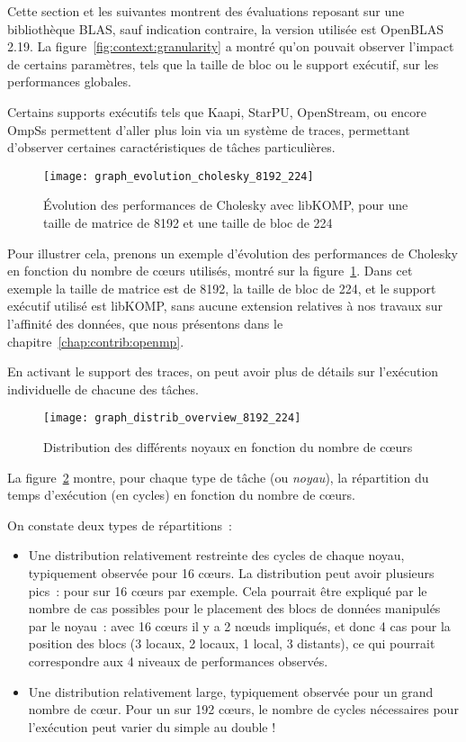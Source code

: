 Cette section et les suivantes montrent des évaluations reposant sur une bibliothèque BLAS, sauf indication contraire, la version utilisée est OpenBLAS 2.19.
La figure~\ref{fig:context:granularity} a montré qu'on pouvait observer l'impact de certains paramètres, tels que la taille de bloc ou le support exécutif, sur les performances globales.

Certains supports exécutifs tels que Kaapi, StarPU, OpenStream, ou encore OmpSs permettent d'aller plus loin via un système de traces, permettant d'observer certaines caractéristiques de tâches particulières.

\begin{figure}[t!]
  \centering
  \texttt{[image: graph\_evolution\_cholesky\_8192\_224]}
  \caption{Évolution des performances de Cholesky avec libKOMP, pour une taille de matrice de 8192 et une taille de bloc de 224}\label{fig:contribs:apps:cholesky:overview-8192-224}
\end{figure}

Pour illustrer cela, prenons un exemple d'évolution des performances de Cholesky en fonction du nombre de cœurs utilisés, montré sur la figure~\ref{fig:contribs:apps:cholesky:overview-8192-224}. Dans cet exemple la taille de matrice est de 8192, la taille de bloc de 224, et le support exécutif utilisé est libKOMP, sans aucune extension relatives à nos travaux sur l'affinité des données, que nous présentons dans le chapitre~\ref{chap:contrib:openmp}.

En activant le support des traces, on peut avoir plus de détails sur l'exécution individuelle de chacune des tâches.

\begin{figure}[h!]
  \centering
  \texttt{[image: graph\_distrib\_overview\_8192\_224]}
  \caption{Distribution des différents noyaux en fonction du nombre de cœurs}\label{fig:contribs:apps:cholesky:distrib-overview-8192-224}
\end{figure}

La figure~\ref{fig:contribs:apps:cholesky:distrib-overview-8192-224} montre, pour chaque type de tâche (ou \emph{noyau}), la répartition du temps d'exécution (en cycles) en fonction du nombre de cœurs.

On constate deux types de répartitions~:
\begin{itemize}
  \item Une distribution relativement restreinte des cycles de chaque noyau, typiquement observée pour 16 cœurs.
    La distribution peut avoir plusieurs pics~: pour \gemm sur 16 cœurs par exemple.
    Cela pourrait être expliqué par le nombre de cas possibles pour le placement des blocs de données manipulés par le noyau~: avec 16 cœurs il y a 2 nœuds impliqués, et donc 4 cas pour la position des blocs (3 locaux, 2 locaux, 1 local, 3 distants), ce qui pourrait correspondre aux 4 niveaux de performances observés.
  \item Une distribution relativement large, typiquement observée pour un grand nombre de cœur. Pour un \gemm sur 192 cœurs, le nombre de cycles nécessaires pour l'exécution peut varier du simple au double !
\end{itemize}

